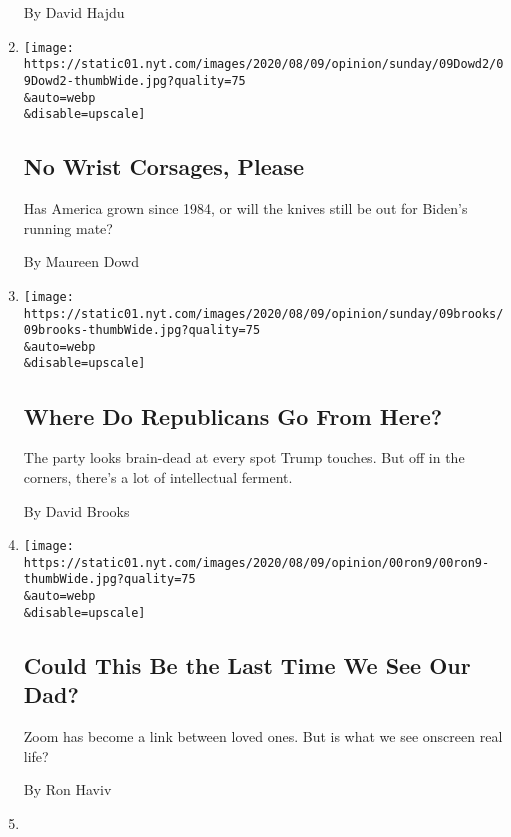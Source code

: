 \begin{enumerate}
  By David Hajdu
\item
  \href{/2020/08/08/opinion/sunday/biden-vice-president-geraldine-ferraro.html}{}

  \texttt{[image: https://static01.nyt.com/images/2020/08/09/opinion/sunday/09Dowd2/09Dowd2-thumbWide.jpg?quality=75\\\&auto=webp\\\&disable=upscale]}

  \hypertarget{no-wrist-corsages-please}{%
  \subsection{No Wrist Corsages,
  Please}\label{no-wrist-corsages-please}}

  Has America grown since 1984, or will the knives still be out for
  Biden's running mate?

  By Maureen Dowd
\item
  \href{/2020/08/07/opinion/sunday/republican-party-trump-2020.html}{}

  \texttt{[image: https://static01.nyt.com/images/2020/08/09/opinion/sunday/09brooks/09brooks-thumbWide.jpg?quality=75\\\&auto=webp\\\&disable=upscale]}

  \hypertarget{where-do-republicans-go-from-here}{%
  \subsection{Where Do Republicans Go From
  Here?}\label{where-do-republicans-go-from-here}}

  The party looks brain-dead at every spot Trump touches. But off in the
  corners, there's a lot of intellectual ferment.

  By David Brooks
\item
  \href{/2020/08/06/opinion/sunday/coronavirus-baruch-haviv-death.html}{}

  \texttt{[image: https://static01.nyt.com/images/2020/08/09/opinion/00ron9/00ron9-thumbWide.jpg?quality=75\\\&auto=webp\\\&disable=upscale]}

  \hypertarget{could-this-be-the-last-time-we-see-our-dad}{%
  \subsection{Could This Be the Last Time We See Our
  Dad?}\label{could-this-be-the-last-time-we-see-our-dad}}

  Zoom has become a link between loved ones. But is what we see onscreen
  real life?

  By Ron Haviv
\item
  \href{/2020/08/06/opinion/sunday/gloria-purvis-george-floyd-blm.html}{}


\end{enumerate}
